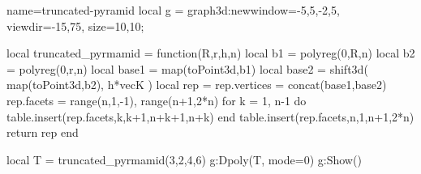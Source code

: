 \documentclass[12pt]{standalone}
\begin{document}
\begin{luadraw}{name=truncated-pyramid}
local g = graph3d:new{window={-5,5,-2,5}, viewdir={-15,75}, size={10,10}};

local truncated_pyrmamid = function(R,r,h,n)
    local b1 = polyreg(0,R,n)
    local b2 = polyreg(0,r,n)
    local base1 = map(toPoint3d,b1)
    local base2 = shift3d( map(toPoint3d,b2), h*vecK )
    local rep = {}
    rep.vertices = concat(base1,base2)
    rep.facets = { range(n,1,-1), range(n+1,2*n)}
        for k = 1, n-1 do
        table.insert(rep.facets,{k,k+1,n+k+1,n+k})
    end
    table.insert(rep.facets,{n,1,n+1,2*n})
    return rep
end

local T = truncated_pyrmamid(3,2,4,6)
g:Dpoly(T, {mode=0})
g:Show()
\end{luadraw}
\end{document}
